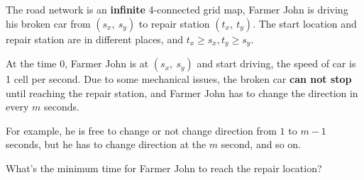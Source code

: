 The road network is an \textbf{infinite} 4-connected grid map, Farmer John is driving his broken car from $(s_x,\ s_y)$ 
to repair station $(t_x,\ t_y)$. The start location and repair station are in different places,
and $t_x \ge s_x, t_y \ge s_y$.

At the time $0$, Farmer John is at $(s_x,\ s_y)$ and start driving, the speed of car is 1 cell per second.
Due to some mechanical issues, the broken car \textbf{can not stop} until reaching the repair station, and Farmer John has to change the direction in every $m$ seconds.

For example, he is free to change or not change direction from $1$ to $m-1$ seconds, but he has to change direction at the $m$ second, and so on.

What's the minimum time for Farmer John to reach the repair location?
